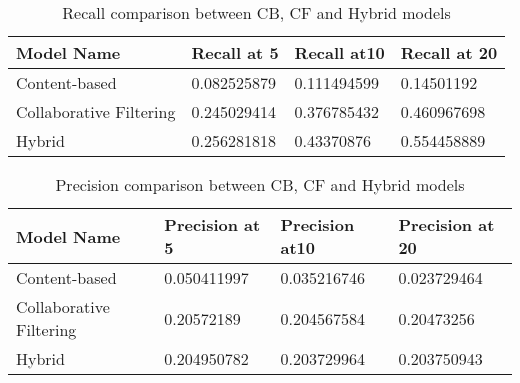 \begin{table}[H]
\centering
\begin{tabular}{|l|l|l|l|}
\hline
\rowcolor[HTML]{C0C0C0} 
{\color[HTML]{000000} \textbf{Model Name}}     & {\color[HTML]{000000} \textbf{Recall at 5}} & {\color[HTML]{000000} \textbf{Recall at10}} & {\color[HTML]{000000} \textbf{Recall at 20}} \\ \hline
{\color[HTML]{000000} Content-based}           & {\color[HTML]{000000} 0.082525879}          & {\color[HTML]{000000} 0.111494599}          & {\color[HTML]{000000} 0.14501192}            \\ \hline
{\color[HTML]{000000} Collaborative Filtering} & {\color[HTML]{000000} 0.245029414}          & {\color[HTML]{000000} 0.376785432}          & {\color[HTML]{000000} 0.460967698}           \\ \hline
{\color[HTML]{000000} Hybrid}                  & {\color[HTML]{000000} 0.256281818}          & {\color[HTML]{000000} 0.43370876}           & {\color[HTML]{000000} 0.554458889}           \\ \hline
\end{tabular}
\caption{Recall comparison between CB, CF and Hybrid models}
\label{tb:recall}
\end{table}

\vspace{-0.5em}

\begin{table}[H]
\centering
\begin{tabular}{|l|l|l|l|}
\hline
\rowcolor[HTML]{C0C0C0} 
{\color[HTML]{000000} \textbf{Model Name}}     & {\color[HTML]{000000} \textbf{Precision at 5}} & {\color[HTML]{000000} \textbf{Precision at10}} & {\color[HTML]{000000} \textbf{Precision at 20}} \\ \hline
{\color[HTML]{000000} Content-based}           & {\color[HTML]{000000} 0.050411997}             & {\color[HTML]{000000} 0.035216746}             & {\color[HTML]{000000} 0.023729464}              \\ \hline
{\color[HTML]{000000} Collaborative Filtering} & {\color[HTML]{000000} 0.20572189}              & {\color[HTML]{000000} 0.204567584}             & {\color[HTML]{000000} 0.20473256}               \\ \hline
{\color[HTML]{000000} Hybrid}                  & {\color[HTML]{000000} 0.204950782}             & {\color[HTML]{000000} 0.203729964}             & {\color[HTML]{000000} 0.203750943}              \\ \hline
\end{tabular}
\caption{Precision comparison between CB, CF and Hybrid models}
\label{tb:precision}
\end{table}

